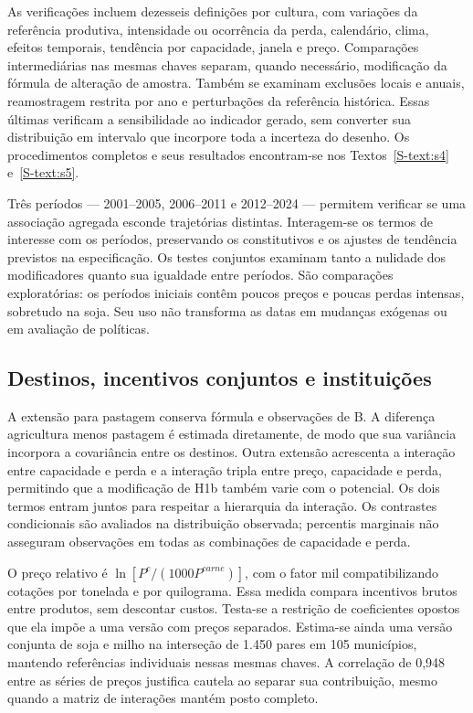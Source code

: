 As verificações incluem dezesseis definições por cultura, com variações da referência produtiva, intensidade ou ocorrência da perda, calendário, clima, efeitos temporais, tendência por capacidade, janela e preço. Comparações intermediárias nas mesmas chaves separam, quando necessário, modificação da fórmula de alteração de amostra. Também se examinam exclusões locais e anuais, reamostragem restrita por ano e perturbações da referência histórica. Essas últimas verificam a sensibilidade ao indicador gerado, sem converter sua distribuição em intervalo que incorpore toda a incerteza do desenho. Os procedimentos completos e seus resultados encontram-se nos Textos~\ref{S-text:s4} e~\ref{S-text:s5}.

Três períodos --- 2001--2005, 2006--2011 e 2012--2024 --- permitem verificar se uma associação agregada esconde trajetórias distintas. Interagem-se os termos de interesse com os períodos, preservando os constitutivos e os ajustes de tendência previstos na especificação. Os testes conjuntos examinam tanto a nulidade dos modificadores quanto sua igualdade entre períodos. São comparações exploratórias: os períodos iniciais contêm poucos preços e poucas perdas intensas, sobretudo na soja. Seu uso não transforma as datas em mudanças exógenas ou em avaliação de políticas.

\subsection{Destinos, incentivos conjuntos e instituições}

A extensão para pastagem conserva fórmula e observações de B. A diferença agricultura menos pastagem é estimada diretamente, de modo que sua variância incorpora a covariância entre os destinos. Outra extensão acrescenta a interação entre capacidade e perda e a interação tripla entre preço, capacidade e perda, permitindo que a modificação de H1b também varie com o potencial. Os dois termos entram juntos para respeitar a hierarquia da interação. Os contrastes condicionais são avaliados na distribuição observada; percentis marginais não asseguram observações em todas as combinações de capacidade e perda.

O preço relativo é $\ln[P^c/(1000P^{carne})]$, com o fator mil compatibilizando cotações por tonelada e por quilograma. Essa medida compara incentivos brutos entre produtos, sem descontar custos. Testa-se a restrição de coeficientes opostos que ela impõe a uma versão com preços separados. Estima-se ainda uma versão conjunta de soja e milho na interseção de 1.450 pares em 105 municípios, mantendo referências individuais nessas mesmas chaves. A correlação de 0,948 entre as séries de preços justifica cautela ao separar sua contribuição, mesmo quando a matriz de interações mantém posto completo.

